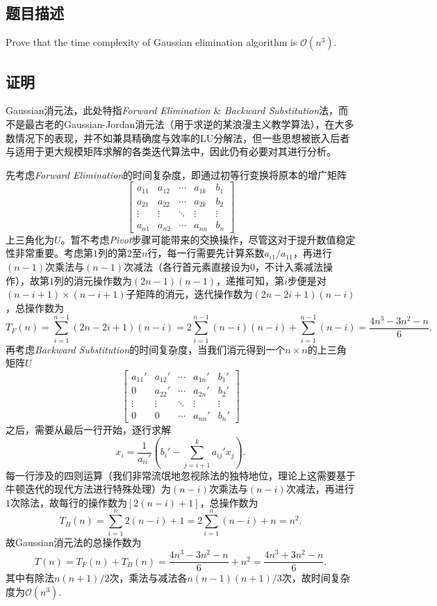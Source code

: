 \subsection{题目描述}
Prove that the time complexity of Gaussian elimination algorithm is $\mathcal{O}(n^3)$.
\subsection{证明}
Gaussian消元法，此处特指\textit{Forward Elimination} \& \textit{Backward Substitution}法，而不是最古老的Gaussian-Jordan消元法（用于求逆的某浪漫主义教学算法），在大多数情况下的表现，并不如兼具精确度与效率的LU分解法，但一些思想被嵌入后者与适用于更大规模矩阵求解的各类迭代算法中，因此仍有必要对其进行分析。


先考虑\textit{Forward Elimination}的时间复杂度，即通过初等行变换将原本的增广矩阵
\[
	\left[\begin{array}{cccc|c}a_{11}&a_{12}&\cdots&a_{1k}&b_{1}\\a_{21}&a_{22}&\cdots&a_{2k}&b_{2}\\\vdots&\vdots&\ddots&\vdots&\vdots\\a_{n 1}&a_{n 2}&\cdots&a_{n n}&b_{n}\end{array}\right]
\]
上三角化为$U$。暂不考虑\textit{Pivot}步骤可能带来的交换操作，尽管这对于提升数值稳定性非常重要。考虑第$1$列的第$2$至$n$行，每一行需要先计算系数$a_{i1}/a_{11}$，再进行$(n-1)$次乘法与$(n-1)$次减法（各行首元素直接设为$0$，不计入乘减法操作），故第$1$列的消元操作数为$(2n-1)(n-1)$，递推可知，第$i$步便是对$(n-i+1)\times(n-i+1)$子矩阵的消元，迭代操作数为$(2n-2i+1)(n-i)$，总操作数为
\[
	T_F(n) =
	\sum_{i=1}^{n-1} (2n-2i+1)(n-i) = 2\sum_{i=1}^{n-1} (n-i)(n-i)+\sum_{i=1}^{n-1} (n-i) = \frac{4n^3-3n^2-n}{6}.
\]
再考虑\textit{Backward Substitution}的时间复杂度，当我们消元得到一个$n \times n$的上三角矩阵$U$
\[
	\left[\begin{array}{cccc|c}a_{11}'&a_{12}'&\cdots&a_{1 n}'&b_{1}'\\0&a_{22}'&\cdots&a_{2 n}'&b_{2}'\\\vdots&\vdots&\ddots&\vdots&\vdots\\0&0&\cdots&a_{n n}'&b_{n}'\end{array}\right]
\]
之后，需要从最后一行开始，逐行求解
\[
	x_i=\frac{1}{a_{i i}'}\left(b_i'-\sum_{j=i+1}^ka_{i j}' x_j\right).
\]
每一行涉及的四则运算（我们非常流氓地忽视除法的独特地位，理论上这需要基于牛顿迭代的现代方法进行特殊处理）为$(n-i)$次乘法与$(n-i)$次减法，再进行$1$次除法，故每行的操作数为$[2(n-i)+1]$，总操作数为
\[
	T_B(n)=\sum_{i=1}^n 2(n-i)+1=2\sum_{i=1}^n (n-i)+n=n^2.
\]
故Gaussian消元法的总操作数为
\[
	T(n)=T_F(n)+T_B(n)=\frac{4n^3-3n^2-n}{6}+n^2=\frac{4n^3+3n^2-n}{6}.
\]
其中有除法$n(n+1)/2$次，乘法与减法各$n(n-1)(n+1)/3$次，故时间复杂度为$\mathcal{O}(n^3)$.

